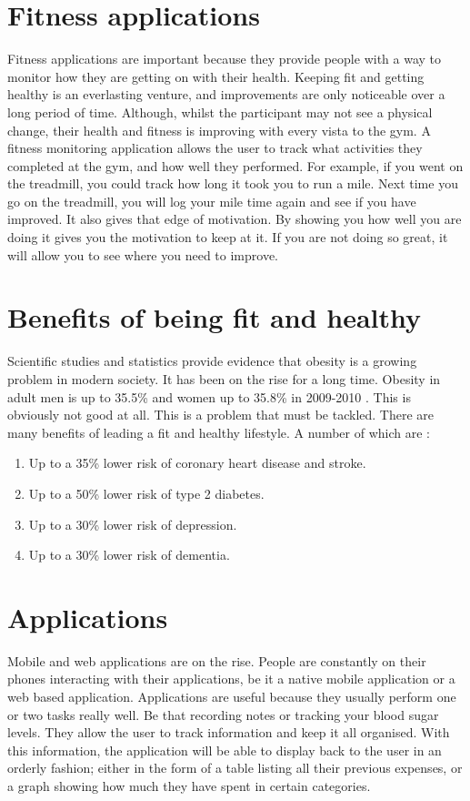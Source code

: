 \section{Fitness applications}
Fitness applications are important because they provide people with a way to monitor how they are getting on with their health. Keeping fit and getting healthy is an everlasting venture, and improvements are only noticeable over a long period of time. Although, whilst the participant may not see a physical change, their health and fitness is improving with every vista to the gym. A fitness monitoring application allows the user to track what activities they completed at the gym, and how well they performed. For example, if you went on the treadmill, you could track how long it took you to run a mile. Next time you go on the treadmill, you will log your mile time again and see if you have improved. It also gives that edge of motivation. By showing you how well you are doing it gives you the motivation to keep at it. If you are not doing so great, it will allow you to see where you need to improve.\\

\section{Benefits of being fit and healthy}
Scientific studies and statistics provide evidence that obesity is a growing problem in modern society. It has been on the rise for a long time. Obesity in adult men is up to 35.5\% and women up to 35.8\% in 2009-2010 \citep{doi:10.1001}. This is obviously not good at all. This is a problem that must be tackled. There are many benefits of leading a fit and healthy lifestyle. A number of which are \citep{nhs:2013}:

\begin{enumerate}
\item {Up to a 35\% lower risk of coronary heart disease and stroke.}
\item {Up to a 50\% lower risk of type 2 diabetes.}
\item {Up to a 30\% lower risk of depression.}
\item {Up to a 30\% lower risk of dementia.}
\end{enumerate}

\section{Applications}
Mobile and web applications are on the rise. People are constantly on their phones interacting with their applications, be it a native mobile application or a web based application. Applications are useful because they usually perform one or two tasks really well. Be that recording notes or tracking your blood sugar levels. They allow the user to track information and keep it all organised. With this information, the application will be able to display back to the user in an orderly fashion; either in the form of a table listing all their previous expenses, or a graph showing how much they have spent in certain categories.

